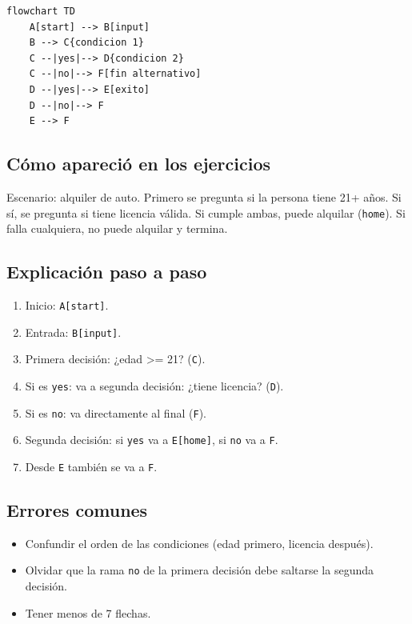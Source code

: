 \documentclass[12pt]{article}
\begin{document}
\begin{lstlisting}[style=mermaidstyle]
flowchart TD
    A[start] --> B[input]
    B --> C{condicion 1}
    C --|yes|--> D{condicion 2}
    C --|no|--> F[fin alternativo]
    D --|yes|--> E[exito]
    D --|no|--> F
    E --> F
\end{lstlisting}

\subsection{Cómo apareció en los ejercicios}

Escenario: alquiler de auto. Primero se pregunta si la persona tiene 21+ años. Si sí, se pregunta si tiene licencia válida. Si cumple ambas, puede alquilar (\texttt{home}). Si falla cualquiera, no puede alquilar y termina.

\subsection{Explicación paso a paso}

\begin{enumerate}
    \item Inicio: \texttt{A[start]}.
    \item Entrada: \texttt{B[input]}.
    \item Primera decisión: ¿edad >= 21? (\texttt{C}).
    \item Si es \texttt{yes}: va a segunda decisión: ¿tiene licencia? (\texttt{D}).
    \item Si es \texttt{no}: va directamente al final (\texttt{F}).
    \item Segunda decisión: si \texttt{yes} va a \texttt{E[home]}, si \texttt{no} va a \texttt{F}.
    \item Desde \texttt{E} también se va a \texttt{F}.
\end{enumerate}

\subsection{Errores comunes}

\begin{itemize}
    \item Confundir el orden de las condiciones (edad primero, licencia después).
    \item Olvidar que la rama \texttt{no} de la primera decisión debe saltarse la segunda decisión.
    \item Tener menos de 7 flechas.
\end{itemize}
\end{document}
